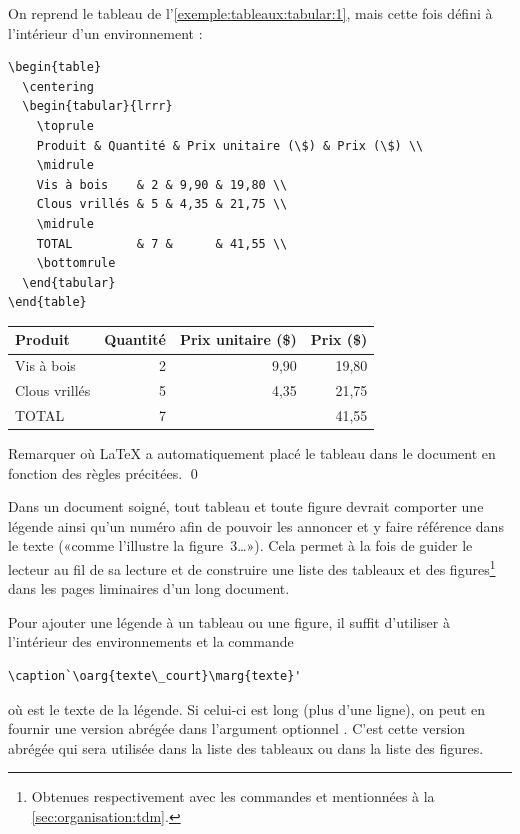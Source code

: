 \begin{exemple}
  On reprend le tableau de l'\autoref{exemple:tableaux:tabular:1}, mais cette
  fois défini à l'intérieur d'un environnement :
\begin{lstlisting}
\begin{table}
  \centering
  \begin{tabular}{lrrr}
    \toprule
    Produit & Quantité & Prix unitaire (\$) & Prix (\$) \\
    \midrule
    Vis à bois    & 2 & 9,90 & 19,80 \\
    Clous vrillés & 5 & 4,35 & 21,75 \\
    \midrule
    TOTAL         & 7 &      & 41,55 \\
    \bottomrule
  \end{tabular}
\end{table}
\end{lstlisting}
  \begin{table}
    \centering
    \begin{tabular}{lrrr}
      \toprule
      Produit & Quantité & Prix unitaire (\$) & Prix (\$) \\
      \midrule
      Vis à bois    & 2 & 9,90 & 19,80 \\
      Clous vrillés & 5 & 4,35 & 21,75 \\
      \midrule
      TOTAL         & 7 &      & 41,55 \\
      \bottomrule
    \end{tabular}
  \end{table}
  Remarquer où {\LaTeX} a automatiquement placé le tableau dans le
  document en fonction des règles précitées. %
  \qed
\end{exemple}

Dans un document soigné, tout tableau et toute figure devrait
comporter une légende ainsi qu'un numéro afin de pouvoir les
annoncer et y faire référence dans le texte («comme l'illustre la
figure~3\dots»). Cela
permet à la fois de guider le lecteur au fil de sa lecture et de
construire une liste des tableaux et des figures\footnote{%
  Obtenues respectivement avec les commandes \cmd{\listoftables} et
  \cmd{\listoffigures} mentionnées à la
  \autoref{sec:organisation:tdm}.} %
dans les pages liminaires d'un long document.

Pour ajouter une légende à un tableau ou une figure, il suffit
d'utiliser à l'intérieur des environnements  et 
la commande
\begin{lstlisting}
\caption`\oarg{texte\_court}\marg{texte}'
\end{lstlisting}
où  est le texte de la légende. Si celui-ci est long
(plus d'une ligne), on peut en fournir une version abrégée dans
l'argument optionnel . C'est cette version abrégée
qui sera utilisée dans la liste des tableaux ou dans la liste des
figures.


